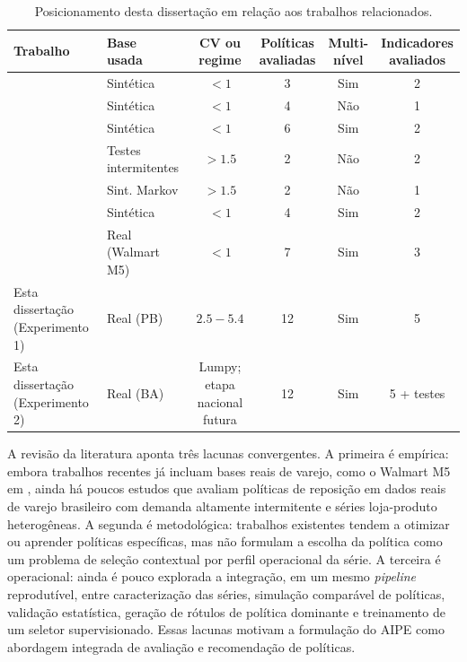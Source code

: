 \begin{table}[htb]
\centering
\footnotesize
\setlength{\tabcolsep}{4pt}
\caption{Posicionamento desta dissertação em relação aos trabalhos relacionados.}
\label{tab:relwork_intro}
\begin{tabular}{@{}p{3.1cm}p{2.1cm}cccc@{}}
\toprule
Trabalho &
\makecell[c]{Base\\usada} &
\makecell[c]{CV ou\\regime} &
\makecell[c]{Políticas\\avaliadas} &
\makecell[c]{Multi-\\nível} &
\makecell[c]{Indicadores\\avaliados} \\
\midrule
\footnotesize\citealt{Oroojlooyjadid2022BeerGameDQN} & Sintética & $<1$ & 3 & Sim & 2 \\
\citealt{Vanvuchelen2020PPOJointReplenishment} & Sintética & $<1$ & 4 & Não & 1 \\
\citealt{Gijsbrechts2022DRLInventoryMSOM} & Sintética & $<1$ & 6 & Sim & 2 \\
\citealt{Yuna2023IntermittentMetaheuristics} & Testes intermitentes & $>1.5$ & 2 & Não & 2 \\
\citealt{Erkayman2025MarkovInventory} & Sint. Markov & $>1.5$ & 2 & Não & 1 \\
\citealt{Liu2024HAPPO} & Sintética & $<1$ & 4 & Sim & 2 \\
\citealt{Zabraoui2025GaDQN} & Real (Walmart M5) & $<1$ & 7 & Sim & 3 \\
\midrule
Esta dissertação (Experimento 1) & Real (PB) & $\mathbf{2.5{-}5.4}$ & 12 & Sim & 5 \\
Esta dissertação (Experimento 2) & Real (BA) & Lumpy; etapa nacional futura & 12 & Sim & 5 + testes \\
\bottomrule
\end{tabular}
\end{table}

A revisão da literatura aponta três lacunas convergentes. A primeira é empírica: embora trabalhos recentes já incluam bases reais de varejo, como o Walmart M5 em \citet{Zabraoui2025GaDQN}, ainda há poucos estudos que avaliam políticas de reposição em dados reais de varejo brasileiro com demanda altamente intermitente e séries loja-produto heterogêneas. A segunda é metodológica: trabalhos existentes tendem a otimizar ou aprender políticas específicas, mas não formulam a escolha da política como um problema de seleção contextual por perfil operacional da série. A terceira é operacional: ainda é pouco explorada a integração, em um mesmo \textit{pipeline} reprodutível, entre caracterização das séries, simulação comparável de políticas, validação estatística, geração de rótulos de política dominante e treinamento de um seletor supervisionado. Essas lacunas motivam a formulação do AIPE como abordagem integrada de avaliação e recomendação de políticas.

